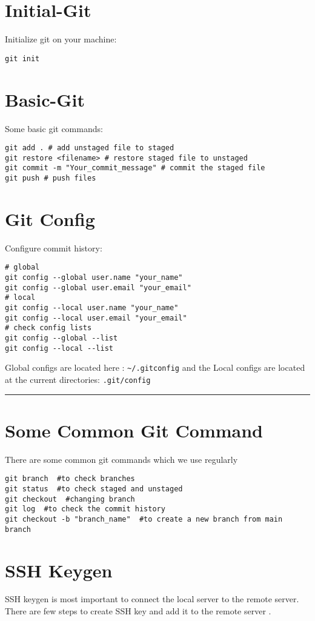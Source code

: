 \documentclass{article}
\begin{document}
\section{Initial-Git}
Initialize git on your machine:
\begin{lstlisting}
git init
\end{lstlisting}

\vspace{1cm}

\section{Basic-Git}
Some basic git commands:
\begin{lstlisting}
git add . # add unstaged file to staged
git restore <filename> # restore staged file to unstaged
git commit -m "Your_commit_message" # commit the staged file
git push # push files
\end{lstlisting}

\section{Git Config}
Configure commit history:
\begin{lstlisting}
# global
git config --global user.name "your_name"
git config --global user.email "your_email"
# local
git config --local user.name "your_name"
git config --local user.email "your_email"
# check config lists
git config --global --list
git config --local --list
\end{lstlisting}
Global configs are located here : \texttt{\~{}/.gitconfig} and the Local configs are located at the current directories: \texttt{.git/config}  
\vspace{0.5cm}
\hrule
\vspace{0.5cm} 

\section{Some Common Git Command}
There are some common git commands which we use regularly
\begin{lstlisting}
git branch  #to check branches
git status  #to check staged and unstaged
git checkout  #changing branch 
git log  #to check the commit history
git checkout -b "branch_name"  #to create a new branch from main branch 
\end{lstlisting}

\section{SSH Keygen}
SSH keygen is most important to connect the local server to the remote server. There are few steps to create SSH key and add it to the remote server . 
\end{document}
